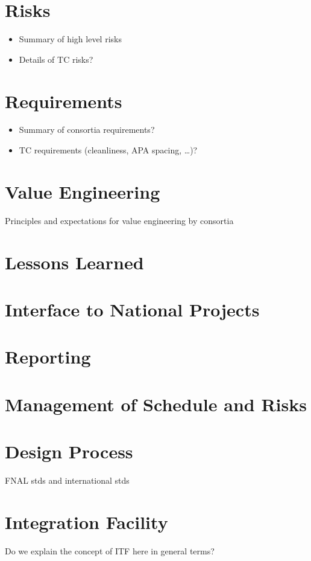 \section{Risks}
\label{sec:fdsp-coord-risks}

\begin{itemize}
 \item Summary of high level risks
 \item Details of TC risks?
\end{itemize}

\section{Requirements}
\label{sec:fdsp-coord-requirements}

\begin{itemize}
 \item Summary of consortia requirements?
 \item TC requirements (cleanliness, APA spacing, …)?
\end{itemize}

\section{Value Engineering}
\label{sec:fdsp-coord-ve}

Principles and expectations for value engineering by consortia

\section{Lessons Learned}
\label{sec:fdsp-coord-lessons}


\section{Interface to National Projects}
\label{sec:fdsp-coord-national}


\section{Reporting}
\label{sec:fdsp-coord-reporting}


\section{Management of Schedule and Risks}
\label{sec:fdsp-coord-mgmt}


\section{Design Process}
\label{sec:fdsp-coord-designprocess}

FNAL stds and international stds

\section{Integration Facility}
\label{sec:fdsp-coord-itf}

Do we explain the concept of ITF here in general terms?

